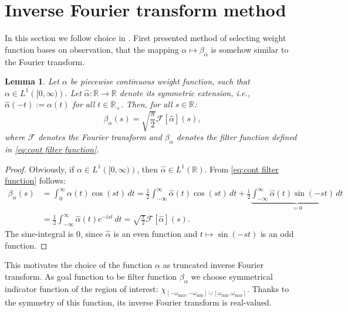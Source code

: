 \documentclass[a4paper,11pt,bibliography=totoc,listof=totoc,headinclude=true,cleardoublepage=empty,oneside]{scrbook}
\newtheorem{lemma}[theorem]{Lemma}
\newcommand{\R}{\mathbb{R}}
\renewcommand{\i}{\mathrm{i}}
\newcommand{\F}{\mathcal{F}}
\begin{document}
\section{Inverse Fourier transform method}
In this section we follow choice in \cite{nannen}. First presented method of selecting weight function bases on observation, that the mapping $ \alpha \mapsto \beta_\alpha$ is somehow similar to the Fourier transform. 
\begin{lemma}\label{lemma:alpha fourier}
    Let $\alpha$ be piecewise continuous weight function, such that $\alpha \in L^1\left([0, \infty)\right)$. Let $\hat{\alpha}: \R \rightarrow \R$ denote its symmetric extension, i.e., $\hat{\alpha}(-t) := \alpha(t)$ for all $t\in \R_+$. Then, for all $s\in \R$:
    \begin{equation*}
        \beta_\alpha (s) = \sqrt{\frac{\pi}{2}} \F\left[\hat{\alpha}\right] (s),
    \end{equation*}
    where $\mathcal{F}$ denotes the Fourier transform and $\beta_\alpha$ denotes the filter function  defined in \eqref{eq:cont filter function}.
\end{lemma}
\begin{proof}
    Obviously, if $\alpha \in L^1\left([0, \infty)\right)$, then $\hat{\alpha} \in L^1\left(\R\right)$. From \eqref{eq:cont filter function} follows:
    \begin{align*}
        \beta_\alpha (s) &= \int_0^\infty \alpha(t) \cos(s t) \,dt = \frac{1}{2}\int_{-\infty}^\infty \hat{\alpha}(t) \cos(s t) \,dt + \frac{\i}{2} \underbrace{\int_{-\infty}^\infty \hat{\alpha}(t) \sin(-st) \,dt}_{=0} \\&= \frac{1}{2} \int_{-\infty}^{\infty} \hat{\alpha}(t) e^{-\i st} \, dt = \sqrt{\frac{\pi}{2}} \F\left[\hat{\alpha}\right] (s).
    \end{align*}
    The sine-integral is 0, since $\hat{\alpha}$ is an even function and $t \mapsto \sin(-st)$ is an odd function. 
\end{proof}

This motivates the choice of the function $\alpha$ as truncated inverse Fourier transform. As goal function to be filter function $\beta_\alpha$ we choose symmetrical indicator function of the region of interest: $\chi_{\left[-\omega_{\max}, -\omega_{\min}\right]\cup\left[\omega_{\min}, \omega_{\max}\right]}$. Thanks to the symmetry of this function, its inverse Fourier transform is real-valued.
\end{document}
